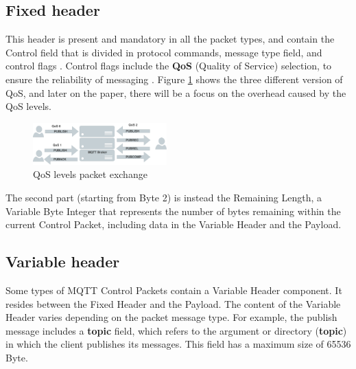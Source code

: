 \documentclass[journal]{IEEEtran}
\begin{document}
\subsection{Fixed header}
This header is present and mandatory in all the packet types, and contain the Control field that is divided in protocol commands, message type field, and control flags \cite{steven}.
Control flags include the \textbf{QoS} (Quality of Service) selection, to ensure the reliability of messaging \cite{qoslevel}.
Figure \ref{fig:qos_level} shows the three different version of QoS, and later on the paper, there will be a focus on the overhead caused by the QoS levels. 

\begin{figure}[h]
	\centering
	\includegraphics[width=0.46\textwidth]{qos_str}    
	\caption{QoS levels packet exchange}
	\label{fig:qos_level}
\end{figure}

The second part (starting from Byte 2) is instead the Remaining Length, a Variable Byte Integer that represents the number of bytes remaining within the current Control Packet, including data in the Variable Header and the Payload.

\subsection{Variable header}
Some types of MQTT Control Packets contain a Variable Header component. It resides between the Fixed Header and the Payload. 
The content of the Variable Header varies depending on the packet message type. 
For example, the publish message includes a \textbf{topic} field, which refers to the argument or directory (\textbf{topic}) in which the client publishes its messages. This field has a maximum size of 65536 Byte. 
\end{document}
